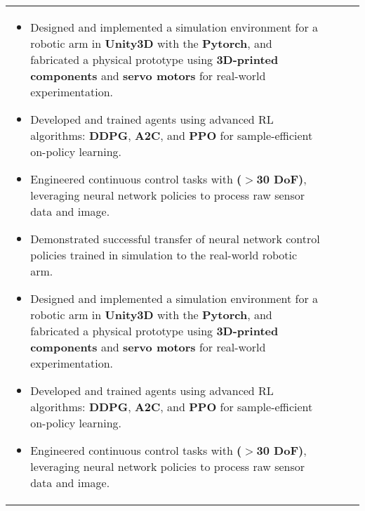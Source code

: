 \documentclass[10pt,a4]{article}
\begin{document}
{\begin{tabu}
\begin{center}
\begin{tabular} {p{} p{} p{} p{}}
\begin{flushleft}
        \vspace{0.25mm}
        \begin{itemize}
            \item Designed and implemented a simulation environment for a robotic arm in \textbf{Unity3D} with the \textbf{Pytorch}, and fabricated a physical prototype using \textbf{3D-printed components} and \textbf{servo motors} for real-world experimentation.
            \item Developed and trained agents using advanced RL algorithms: \textbf{DDPG}, \textbf{A2C}, and \textbf{PPO} for sample-efficient on-policy learning.
            \item Engineered continuous control tasks with \textbf{($>$30 DoF)}, leveraging neural network policies to process raw sensor data and image.
            \item Demonstrated successful transfer of neural network control policies trained in simulation to the real-world robotic arm.
            \item Designed and implemented a simulation environment for a robotic arm in \textbf{Unity3D} with the \textbf{Pytorch}, and fabricated a physical prototype using \textbf{3D-printed components} and \textbf{servo motors} for real-world experimentation.
            \item Developed and trained agents using advanced RL algorithms: \textbf{DDPG}, \textbf{A2C}, and \textbf{PPO} for sample-efficient on-policy learning.
            \item Engineered continuous control tasks with \textbf{($>$30 DoF)}, leveraging neural network policies to process raw sensor data and image.

\end{itemize}
\end{flushleft}
\end{tabular}
\end{center}
\end{tabu}}
\end{document}

